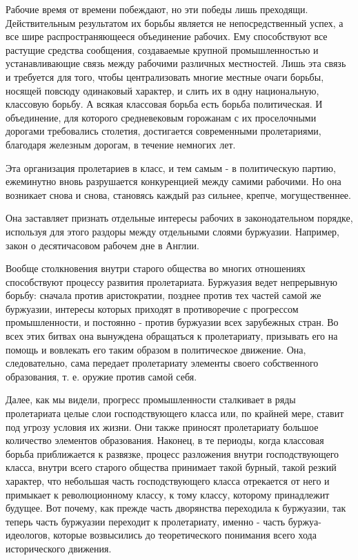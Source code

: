 \documentclass[12pt]{article}
\newcommand{\parnum}{(\arabic{parcount})}
\newcounter{parcount}
\newenvironment{parnumbers}{%
  \par%
  \everypar{\noindent \stepcounter{parcount}\marginpar[]{\parnum}}%
}{}
\begin{document}
\begin{parnumbers}
    Рабочие время от времени побеждают, но эти победы лишь преходящи. Действительным результатом их борьбы является не непосредственный успех, а все шире распространяющееся объединение рабочих. Ему способствуют все растущие средства сообщения, создаваемые крупной промышленностью и устанавливающие связь между рабочими различных местностей. Лишь эта связь и требуется для того, чтобы централизовать многие местные очаги борьбы, носящей повсюду одинаковый характер, и слить их в одну национальную, классовую борьбу. А всякая классовая борьба есть борьба политическая. И объединение, для которого средневековым горожанам с их проселочными дорогами требовались столетия, достигается современными пролетариями, благодаря железным дорогам, в течение немногих лет.

    Эта организация пролетариев в класс, и тем самым - в политическую партию, ежеминутно вновь разрушается конкуренцией между самими рабочими. Но она возникает снова и снова, становясь каждый раз сильнее, крепче, могущественнее.

    Она заставляет признать отдельные интересы рабочих в законодательном порядке, используя для этого раздоры между отдельными слоями буржуазии. Например, закон о десятичасовом рабочем дне в Англии.

    Вообще столкновения внутри старого общества во многих отношениях способствуют процессу развития пролетариата. Буржуазия ведет непрерывную борьбу: сначала против аристократии, позднее против тех частей самой же буржуазии, интересы которых приходят в противоречие с прогрессом промышленности, и постоянно - против буржуазии всех зарубежных стран. Во всех этих битвах она вынуждена обращаться к пролетариату, призывать его на помощь и вовлекать его таким образом в политическое движение. Она, следовательно, сама передает пролетариату элементы своего собственного образования, т. е. оружие против самой себя.

    Далее, как мы видели, прогресс промышленности сталкивает в ряды пролетариата целые слои господствующего класса или, по крайней мере, ставит под угрозу условия их жизни. Они также приносят пролетариату большое количество элементов образования. Наконец, в те периоды, когда классовая борьба приближается к развязке, процесс разложения внутри господствующего класса, внутри всего старого общества принимает такой бурный, такой резкий характер, что небольшая часть господствующего класса отрекается от него и примыкает к революционному классу, к тому классу, которому принадлежит будущее. Вот почему, как прежде часть дворянства переходила к буржуазии, так теперь часть буржуазии переходит к пролетариату, именно - часть буржуа-идеологов, которые возвысились до теоретического понимания всего хода исторического движения.


\end{parnumbers}
\end{document}
